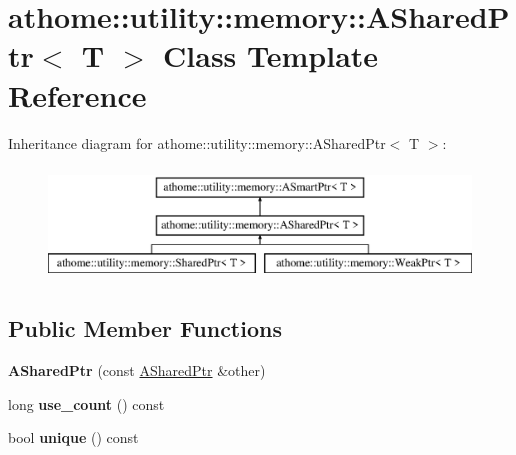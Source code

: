 \hypertarget{classathome_1_1utility_1_1memory_1_1_a_shared_ptr}{}\section{athome\+:\+:utility\+:\+:memory\+:\+:A\+Shared\+Ptr$<$ T $>$ Class Template Reference}
\label{classathome_1_1utility_1_1memory_1_1_a_shared_ptr}
Inheritance diagram for athome\+:\+:utility\+:\+:memory\+:\+:A\+Shared\+Ptr$<$ T $>$\+:\begin{figure}[H]
\begin{center}
\leavevmode
\includegraphics[height=3.000000cm]{classathome_1_1utility_1_1memory_1_1_a_shared_ptr}
\end{center}
\end{figure}
\subsection*{Public Member Functions}
\begin{DoxyCompactItemize}
\item 
\mbox{\label{classathome_1_1utility_1_1memory_1_1_a_shared_ptr_a17ed0c5d7ed1a6ea5c8851cd0a9c4391}} 
{\bfseries A\+Shared\+Ptr} (const \mbox{\hyperlink{classathome_1_1utility_1_1memory_1_1_a_shared_ptr}{A\+Shared\+Ptr}} \&other)
\item 
\mbox{\label{classathome_1_1utility_1_1memory_1_1_a_shared_ptr_abc9922bb163452c0dc9b7f912a21c85f}} 
long {\bfseries use\+\_\+count} () const
\item 
\mbox{\label{classathome_1_1utility_1_1memory_1_1_a_shared_ptr_af47f9fdb8b16e128414d01bc8470a581}} 
bool {\bfseries unique} () const
\end{DoxyCompactItemize}
